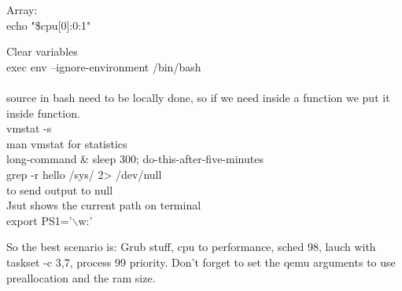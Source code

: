 \documentclass[11pt, a4paper, oneside]{article}
\theoremstyle{definition}
\begin{document}
Array:\\
echo "\${cpu[0]:0:1}"

Clear variables\\
exec env --ignore-environment /bin/bash\\
\\
source in bash need to be locally done, so if we need inside a function we put it inside function.\\
vmstat -s\\
man vmstat for statistics\\

long-command \& sleep 300; do-this-after-five-minutes\\

grep -r hello /sys/ 2> /dev/null\\ 
to send output to null\\

Jsut shows the current path on terminal\\
export PS1='$\backslash$w:'

So the best scenario is:
Grub stuff, cpu to performance, sched 98, lauch with taskset -c 3,7, process 99 priority.
Don't forget to set the qemu arguments to use preallocation and the ram size.\\

\end{document}
